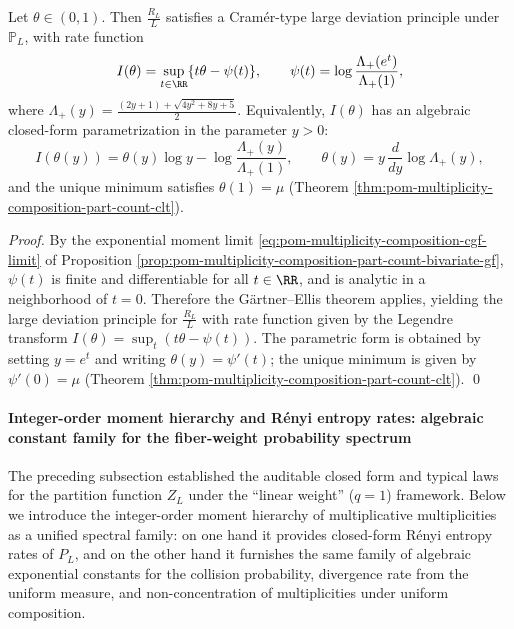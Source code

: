 \begin{theorem}\label{thm:pom-multiplicity-composition-part-density-ldp}
Let \(\theta\in(0,1)\).
Then \(\frac{R_L}{L}\) satisfies a Cram\'er-type large deviation principle under \(\mathbb{P}_L\), with rate function
\[
I(\theta)=\sup_{t\in\RR}\{t\theta-\psi(t)\},
\qquad
\psi(t)=\log\frac{\Lambda_+(e^{t})}{\Lambda_+(1)},
\]
where
\(
\Lambda_+(y)=\frac{(2y+1)+\sqrt{4y^2+8y+5}}{2}
\).
Equivalently, \(I(\theta)\) has an algebraic closed-form parametrization in the parameter \(y>0\):
\[
I(\theta(y))=\theta(y)\log y-\log\frac{\Lambda_+(y)}{\Lambda_+(1)},
\qquad
\theta(y)=y\,\frac{d}{dy}\log \Lambda_+(y),
\]
and the unique minimum satisfies
\(
\theta(1)=\mu
\)
(Theorem \ref{thm:pom-multiplicity-composition-part-count-clt}).
\end{theorem}
\begin{proof}
By the exponential moment limit \eqref{eq:pom-multiplicity-composition-cgf-limit} of Proposition \ref{prop:pom-multiplicity-composition-part-count-bivariate-gf},
\(\psi(t)\) is finite and differentiable for all \(t\in\RR\), and is analytic in a neighborhood of \(t=0\).
Therefore the G\"artner--Ellis theorem applies, yielding the large deviation principle for \(\frac{R_L}{L}\) with rate function given by the Legendre transform
\(
I(\theta)=\sup_t(t\theta-\psi(t))
\).
The parametric form is obtained by setting \(y=e^t\) and writing \(\theta(y)=\psi'(t)\);
the unique minimum is given by \(\psi'(0)=\mu\) (Theorem \ref{thm:pom-multiplicity-composition-part-count-clt}). \qed
\end{proof}

\paragraph{Integer-order moment hierarchy and R\'enyi entropy rates: algebraic constant family for the fiber-weight probability spectrum}
The preceding subsection established the auditable closed form and typical laws for the partition function \(Z_L\) under the ``linear weight'' (\(q=1\)) framework.
Below we introduce the integer-order moment hierarchy of multiplicative multiplicities as a unified spectral family: on one hand it provides closed-form R\'enyi entropy rates of \(P_L\),
and on the other hand it furnishes the same family of algebraic exponential constants for the collision probability, divergence rate from the uniform measure, and non-concentration of multiplicities under uniform composition.

